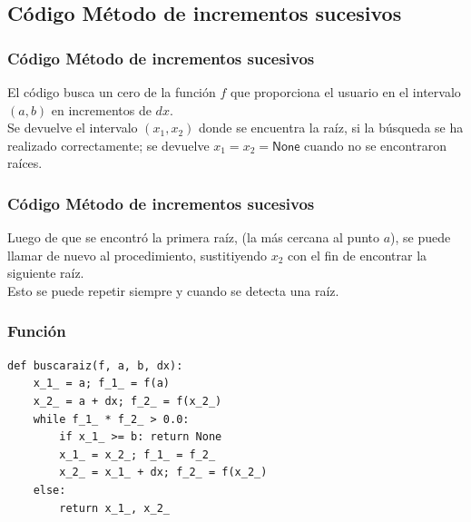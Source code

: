 \subsection{Código Método de incrementos sucesivos}
\begin{frame}
\frametitle{Código Método de incrementos sucesivos}
El código busca un cero de la función $f$ que proporciona el usuario en el intervalo
$(a, b)$ en incrementos de $dx$.
\\
\bigskip
Se devuelve el intervalo $(x_{1}, x_{2})$ donde se encuentra la raíz, si la búsqueda
se ha realizado correctamente; se devuelve $x_{1} = x_{2} = \mathsf{None}$ cuando no se encontraron raíces.
\end{frame}
\begin{frame}
\frametitle{Código Método de incrementos sucesivos}
Luego de que se encontró la primera raíz, (la más cercana al punto $a$), se puede llamar de nuevo al procedimiento, sustitiyendo $x_{2}$ con el fin de encontrar la siguiente raíz. 
\\
\bigskip
Esto se puede repetir siempre y cuando se detecta una raíz.
\end{frame}
\begin{frame}[fragile]
\frametitle{Función }
\begin{lstlisting}[caption=Función buscaraiz, style= FormattedNumber, basicstyle=\linespread{1.1}\ttfamily=\small, columns=fullflexible]
def buscaraiz(f, a, b, dx):
    x_1_ = a; f_1_ = f(a)
    x_2_ = a + dx; f_2_ = f(x_2_)
    while f_1_ * f_2_ > 0.0:
        if x_1_ >= b: return None
        x_1_ = x_2_; f_1_ = f_2_
        x_2_ = x_1_ + dx; f_2_ = f(x_2_)
    else:
        return x_1_, x_2_
\end{lstlisting}
\end{frame}
